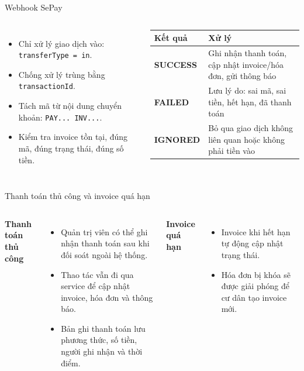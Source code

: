 \documentclass[t, aspectratio=169]{beamer}
\newcommand{\tech}[1]{\textcolor{diagramBlue}{\texttt{\footnotesize #1}}}
\begin{document}
\begin{frame}{Webhook SePay}
\begin{columns}[T,onlytextwidth]
\begin{itemize}
  \item Chỉ xử lý giao dịch vào: \tech{transferType = in}.
  \item Chống xử lý trùng bằng \tech{transactionId}.
  \item Tách mã từ nội dung chuyển khoản: \tech{PAY... INV...}.
  \item Kiểm tra invoice tồn tại, đúng mã, đúng trạng thái, đúng số tiền.
\end{itemize}
\footnotesize
\begin{tabularx}{\linewidth}{>{\bfseries\RaggedRight\arraybackslash}P{1.55cm} Q}
\toprule
Kết quả & Xử lý\\
\midrule
SUCCESS & Ghi nhận thanh toán, cập nhật invoice/hóa đơn, gửi thông báo\\
FAILED & Lưu lý do: sai mã, sai tiền, hết hạn, đã thanh toán\\
IGNORED & Bỏ qua giao dịch không liên quan hoặc không phải tiền vào\\
\bottomrule
\end{tabularx}
\end{columns}
\end{frame}

\begin{frame}{Thanh toán thủ công và invoice quá hạn}
\begin{columns}[T,onlytextwidth]
\textbf{\textcolor{hustprimary}{Thanh toán thủ công}}
\begin{itemize}
  \item Quản trị viên có thể ghi nhận thanh toán sau khi đối soát ngoài hệ thống.
  \item Thao tác vẫn đi qua service để cập nhật invoice, hóa đơn và thông báo.
  \item Bản ghi thanh toán lưu phương thức, số tiền, người ghi nhận và thời điểm.
\end{itemize}
\textbf{\textcolor{hustprimary}{Invoice quá hạn}}
\begin{itemize}
  \item Invoice khi hết hạn tự động cập nhật trạng thái.
  \item Hóa đơn bị khóa sẽ được giải phóng để cư dân tạo invoice mới.
\end{itemize}
\end{columns}
\end{frame}
\end{document}
